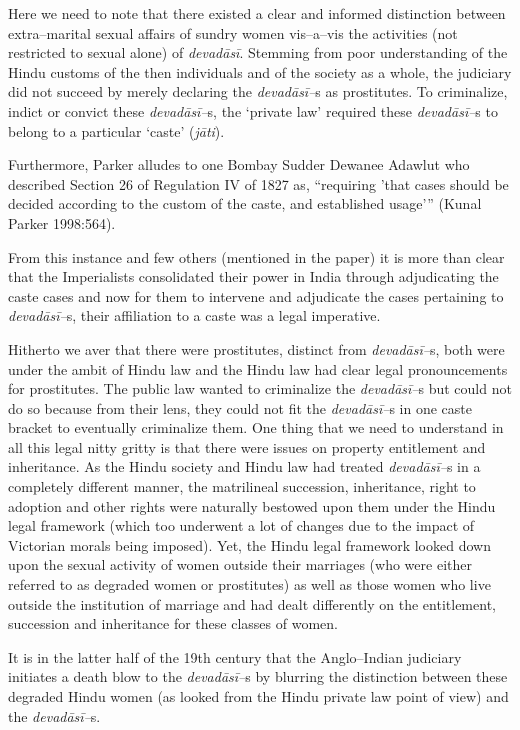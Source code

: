 Here we need to note that there existed a clear and informed distinction between extra–marital sexual affairs of sundry women vis–a–vis the activities (not restricted to sexual alone) of \textit{devadāsī}. Stemming from poor understanding of the Hindu customs of the then individuals and of the society as a whole, the judiciary did not succeed by merely declaring the \textit{devadāsī–}s as prostitutes. To criminalize, indict or convict these \textit{devadāsī–}s, the ‘private law’ required these \textit{devadāsī–}s to belong to a particular ‘caste’ (\textit{jāti}).

Furthermore, Parker alludes to one Bombay Sudder Dewanee Adawlut who described Section 26 of Regulation IV of 1827 as, “requiring 'that cases should be decided according to the custom of the caste, and established usage’” (Kunal Parker 1998:564).

From this instance and few others (mentioned in the paper) it is more than clear that the Imperialists consolidated their power in India through adjudicating the caste cases and now for them to intervene and adjudicate the cases pertaining to \textit{devadāsī–}s, their affiliation to a caste was a legal imperative.

Hitherto we aver that there were prostitutes, distinct from \textit{devadāsī–}s, both were under the ambit of Hindu law and the Hindu law had clear legal pronouncements for prostitutes. The public law wanted to criminalize the \textit{devadāsī–}s but could not do so because from their lens, they could not fit the \textit{devadāsī–}s in one caste bracket to eventually criminalize them. One thing that we need to understand in all this legal nitty gritty is that there were issues on property entitlement and inheritance. As the Hindu society and Hindu law had treated \textit{devadāsī–}s in a completely different manner, the matrilineal succession, inheritance, right to adoption and other rights were naturally bestowed upon them under the Hindu legal framework (which too underwent a lot of changes due to the impact of Victorian morals being imposed). Yet, the Hindu legal framework looked down upon the sexual activity of women outside their marriages (who were either referred to as degraded women or prostitutes) as well as those women who live outside the institution of marriage and had dealt differently on the entitlement, succession and inheritance for these classes of women.

It is in the latter half of the 19th century that the Anglo–Indian judiciary initiates a death blow to the \textit{devadāsī–}s by blurring the distinction between these degraded Hindu women (as looked from the Hindu private law point of view) and the \textit{devadāsī–}s.

